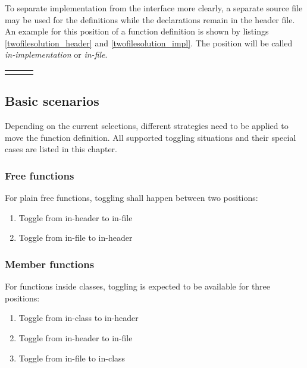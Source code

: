 

To  separate implementation from the interface more 
clearly, a separate source file may be used for the definitions while the 
declarations remain in the header file. An example for this position of a 
function definition is shown by listings \ref{twofilesolution_header} and
\ref{twofilesolution_impl}. The position will be called 
\textit{in-implementation} or \textit{in-file}.

\begin{tabular}{p{5cm}p{.4cm}p{5cm}}

& & 

\end{tabular}

\subsection{Basic scenarios}

Depending on the current selections, different strategies need to be applied to 
move the function definition. All supported toggling situations and their 
special cases are listed in this chapter.

\subsubsection{Free functions}
For plain free functions, toggling shall happen between two positions:
\begin{enumerate}
\item Toggle from in-header to in-file
\item Toggle from in-file to in-header
\end{enumerate}

\subsubsection{Member functions}
For functions inside classes, toggling is expected to be available for three 
positions:
\begin{enumerate}
\item Toggle from in-class to in-header
\item Toggle from in-header to in-file
\item Toggle from in-file to in-class
\end{enumerate}


